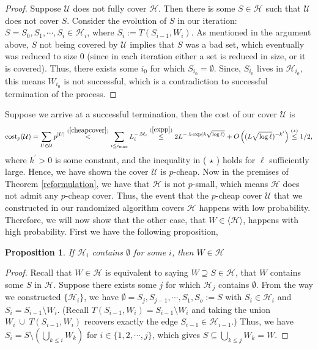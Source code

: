\documentclass[12pt,oneside,reqno]{amsart}
\newtheorem{proposition}[theorem]{Proposition}
\theoremstyle{definition}
\numberwithin{equation}{theorem}
\newcommand{\cH}{{\mathcal H}}
\newcommand{\cU}{{\mathcal U}}
\begin{document}
\begin{proof}
Suppose $\cU$ does not fully cover $\cH$. Then there is some $ S \in \cH$ such that $\cU$ does not cover $S$. Consider the evolution of $S$ in our iteration: $S = S_0, S_1, \cdots, S_i \in \cH_i$, where $S_i := T(S_{i-1},W_i)$. As mentioned in the argument above, $S$ not being covered by $\cU$ implies that $S$ was a bad set, which eventually was reduced to size 0 (since in each iteration either a set is reduced in size, or it is covered). Thus, there exists some $i_0$ for which $S_{i_0} = \emptyset$. Since, $S_{i_0}$ lives in $\cH_{i_0}$, this means $W_{i_0}$ is not successful, which is a contradiction to successful termination of the process.
\end{proof}

Suppose we arrive at a successful termination, then the cost of our cover $\cU$ is
\[
\operatorname{cost}_p(\cU)=
\sum_{U \in \mathcal{U}} p^{|U|} \stackrel{(\ref{cheapcover})}{<} \sum_{i \leq i_{\max }} L_{i}^{-.5 \ell_{i}} \stackrel{(\ref{expp})}{\leq} 2 L^{-.5 \exp (k \sqrt{\log \ell)}}+O\left((L \sqrt{\log \ell})^{-k^{\prime}}\right) \stackrel{(\star)}{\leq} 1 / 2,
\]
where $k^{\prime}>0$ is some constant, and the inequality in ( $\star$ ) holds for $\ell$ sufficiently large. Hence, we have shown the cover $\cU$ is $p$-cheap. Now in the premises of Theorem \ref{reformulation}, we have that $\cH$ is not $p$-small, which means $\cH$ does not admit any $p$-cheap cover. Thus, the event that the $p$-cheap cover $\cU$ that we constructed in our randomized algorithm covers $\cH$ happens with low probability. Therefore, we will now show that the other case, that $W \in \langle \cH \rangle$, happens with high probability. First we have the following proposition,

\begin{proposition}\label{in}
If $\cH_i$ contains $\emptyset$ for some $i$, then $W \in \cH$
\end{proposition}

\begin{proof}
Recall that $W \in \cH$ is equivalent to saying $W \supseteq S \in \cH$, that $W$ contains some $S$ in $\cH$. Suppose there exists some $j$ for which $\cH_j$ contains $\emptyset$. From the way we constructed $\{\cH_i\}$, we have $\emptyset = S_j, S_{j-1}, \cdots, S_1, S_o := S$ with $S_i \in \cH_i$ and $S_i = S_{i-1} \setminus W_i$. (Recall  $T(S_{i-1},W_i) = S_{i-1} \setminus W_i$ and taking the union $W_i ~\cup~ T(S_{i-1},W_i)$ recovers exactly the edge $S_{i-1} \in \cH_{i-1}$.) Thus, we have $S_{i}=S \setminus \left(\bigcup_{k \leq i} W_{k}\right)$ for $i \in \{1,2, \cdots, j\}$, which gives  $S \subseteq \bigcup_{k \leq j} W_{k} = W$.
\end{proof}
\end{document}
